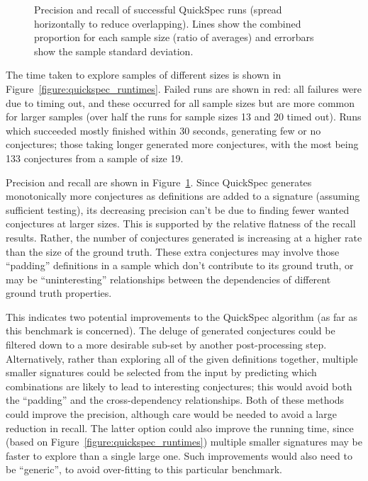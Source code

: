 \begin{figure}
  \centering
  
  \caption{Precision and recall of successful QuickSpec runs (spread
    horizontally to reduce overlapping). Lines show the combined proportion for
    each sample size (ratio of averages) and errorbars show the sample standard
    deviation.}
  \label{figure:quickspec_precRec}
\end{figure}

The time taken to explore samples of different sizes is shown in
Figure~\ref{figure:quickspec_runtimes}. Failed runs are shown in red: all
failures were due to timing out, and these occurred for all sample sizes but are
more common for larger samples (over half the runs for sample sizes 13 and 20
timed out). Runs which succeeded mostly finished within 30 seconds, generating
few or no conjectures; those taking longer generated more conjectures, with the
most being 133 conjectures from a sample of size 19.

Precision and recall are shown in Figure~\ref{figure:quickspec_precRec}.
Since QuickSpec generates monotonically more conjectures as definitions are
added to a signature (assuming sufficient testing), its decreasing precision
can't be due to finding fewer wanted conjectures at larger sizes. This is
supported by the relative flatness of the recall results. Rather, the number of
conjectures generated is increasing at a higher rate than the size of the ground
truth. These extra conjectures may involve those ``padding'' definitions in a
sample which don't contribute to its ground truth, or may be ``uninteresting''
relationships between the dependencies of different ground truth properties.

This indicates two potential improvements to the QuickSpec algorithm (as far as
this benchmark is concerned). The deluge of generated conjectures could be
filtered down to a more desirable sub-set by another post-processing step.
Alternatively, rather than exploring all of the given definitions together,
multiple smaller signatures could be selected from the input by predicting which
combinations are likely to lead to interesting conjectures; this would avoid
both the ``padding'' and the cross-dependency relationships. Both of these
methods could improve the precision, although care would be needed to avoid a
large reduction in recall. The latter option could also improve the running
time, since (based on Figure~\ref{figure:quickspec_runtimes}) multiple smaller
signatures may be faster to explore than a single large one. Such improvements
would also need to be ``generic'', to avoid over-fitting to this particular
benchmark.

